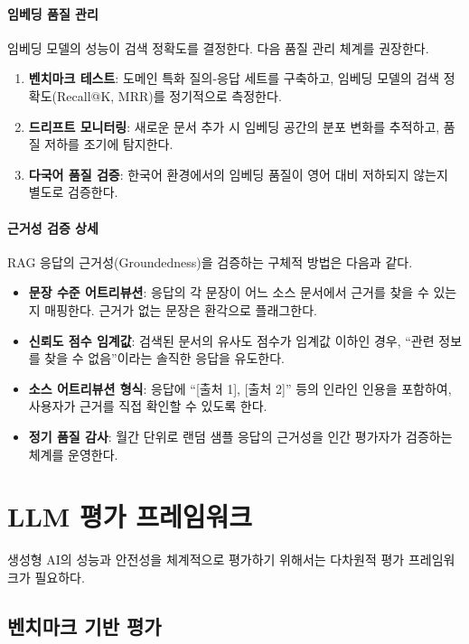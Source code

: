 \paragraph{임베딩 품질 관리}
임베딩 모델의 성능이 검색 정확도를 결정한다. 다음 품질 관리 체계를 권장한다.

\begin{enumerate}
 \item \textbf{벤치마크\cite{openai2023gpt4} 테스트}: 도메인 특화 질의-응답 세트를 구축하고, 임베딩 모델의 검색 정확도(Recall@K, MRR)를 정기적으로 측정한다.
 \item \textbf{드리프트 모니터링}: 새로운 문서 추가 시 임베딩 공간의 분포 변화를 추적하고, 품질 저하를 조기에 탐지한다.
 \item \textbf{다국어 품질 검증}: 한국어 환경에서의 임베딩 품질이 영어 대비 저하되지 않는지 별도로 검증한다.
\end{enumerate}

\paragraph{근거성 검증 상세}
RAG 응답의 근거성(Groundedness)을 검증하는 구체적 방법은 다음과 같다.

\begin{itemize}
 \item \textbf{문장 수준 어트리뷰션}: 응답의 각 문장이 어느 소스 문서에서 근거를 찾을 수 있는지 매핑한다. 근거가 없는 문장은 환각으로 플래그한다.
 \item \textbf{신뢰도 점수 임계값}: 검색된 문서의 유사도 점수가 임계값 이하인 경우, ``관련 정보를 찾을 수 없음''이라는 솔직한 응답을 유도한다.
 \item \textbf{소스 어트리뷰션 형식}: 응답에 ``[출처 1], [출처 2]'' 등의 인라인 인용을 포함하여, 사용자가 근거를 직접 확인할 수 있도록 한다.
 \item \textbf{정기 품질 감사}: 월간 단위로 랜덤 샘플 응답의 근거성을 인간 평가\cite{ouyang2022training}자가 검증하는 체계를 운영한다.
\end{itemize}

\section{LLM 평가 프레임워크}
\label{sec:gen.2.4}

생성형 AI의 성능과 안전성을 체계적으로 평가하기 위해서는 다차원적 평가 프레임워크가 필요하다.

\subsection{벤치마크 기반 평가}


